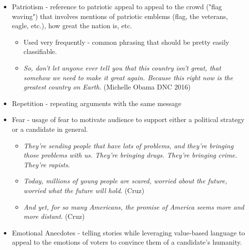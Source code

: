 \documentclass[letterpaper]{article}
\begin{document}
\begin{itemize}
	\item Patriotism - reference to patriotic appeal to appeal to the crowd ("flag waving") that involves mentions of patriotic emblems (flag, the veterans, eagle, etc.), how great the nation is, etc.
		\begin{itemize}
			\item Used very frequently - common phrasing that should be pretty easily classifiable.
			\item \emph{So, don’t let anyone ever tell you that this country isn’t great, that somehow we need to make it great again. Because this right now is the greatest country on Earth.} (Michelle Obama DNC 2016)
		\end{itemize}
	\item Repetition - repeating arguments with the same message
	\item Fear - usage of fear to motivate audience to support either a political strategy or a candidate in general.
		\begin{itemize}
			\item \emph{They’re sending people that have lots of problems, and they’re bringing those problems with us. They’re bringing drugs. They’re bringing crime. They’re rapists.}
			\item {\em Today, millions of young people are scared, worried about the future, worried what the future will hold}. (Cruz)
        	\item  {\em And yet, for so many Americans, the promise of America seems more and more distant}. (Cruz)
		\end{itemize}
	\item Emotional Anecdotes - telling stories while leveraging value-based language to appeal to the emotions of voters to convince them of a candidate's humanity.
\end{itemize}
\end{document}
